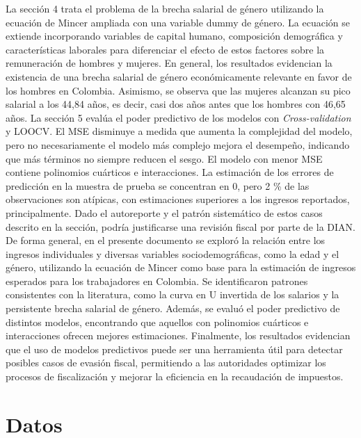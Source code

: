 \documentclass[12pt,a4paper,onecolumn]{article}
\begin{document}
\bigbreak
La sección 4 trata el problema de la brecha salarial de género utilizando la ecuación de Mincer ampliada con una variable dummy de género. La ecuación se extiende incorporando variables de capital humano, composición demográfica y características laborales para diferenciar el efecto de estos factores sobre la remuneración de hombres y mujeres. En general, los resultados evidencian la existencia de una brecha salarial de género económicamente relevante en favor de los hombres en Colombia. Asimismo, se observa que las mujeres alcanzan su pico salarial a los 44,84 años, es decir, casi dos años antes que los hombres con 46,65 años.
\bigbreak
La sección 5 evalúa el poder predictivo de los modelos con \textit{Cross-validation} y LOOCV. El MSE disminuye a medida que aumenta la complejidad del modelo, pero no necesariamente el modelo más complejo mejora el desempeño, indicando que más términos no siempre reducen el sesgo. El modelo con menor MSE contiene polinomios cuárticos e interacciones. La estimación de los errores de predicción en la muestra de prueba se concentran en 0, pero 2 \% de las observaciones son atípicas, con estimaciones superiores a los ingresos reportados, principalmente. Dado el autoreporte y el patrón sistemático de estos casos descrito en la sección, podría justificarse una revisión fiscal por parte de la DIAN.
\bigbreak
De forma general, en el presente documento se exploró la relación entre los ingresos individuales y diversas variables sociodemográficas, como la edad y el género, utilizando la ecuación de Mincer como base para la estimación de ingresos esperados para los trabajadores en Colombia. Se identificaron patrones consistentes con la literatura, como la curva en U invertida de los salarios y la persistente brecha salarial de género. Además, se evaluó el poder predictivo de distintos modelos, encontrando que aquellos con polinomios cuárticos e interacciones ofrecen mejores estimaciones. Finalmente, los resultados evidencian que el uso de modelos predictivos puede ser una herramienta útil para detectar posibles casos de evasión fiscal, permitiendo a las autoridades optimizar los procesos de fiscalización y mejorar la eficiencia en la recaudación de impuestos.


\section{Datos}\label{datos}
\end{document}

